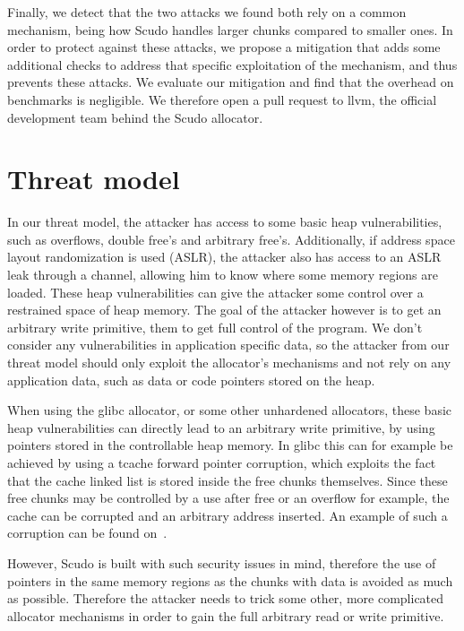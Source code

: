 \documentclass[a4paper,11pt,oneside]{report}
\begin{document}
Finally, we detect that the two attacks we found both rely on a common mechanism, being how
Scudo handles larger chunks compared to smaller ones. In order to protect against these
attacks, we propose a mitigation that adds some additional checks to address that specific
exploitation of the mechanism, and thus prevents these attacks. We evaluate our mitigation
and find that the overhead on benchmarks is negligible. We therefore open a pull request
to llvm, the official development team behind the Scudo allocator.

\chapter{Threat model}

In our threat model, the attacker has access to some basic heap vulnerabilities, such
as overflows, double free's and arbitrary free's. Additionally, if address space layout
randomization is used (ASLR), the attacker also has access to an ASLR leak through a
channel, allowing him to know where some memory regions are loaded.
These heap vulnerabilities can give the
attacker some control over a restrained space of heap memory. The goal of the attacker
however is to get an arbitrary write primitive, them to get full control of the 
program. We don't consider any vulnerabilities in application specific data, so the
attacker from our threat model should only exploit the allocator's mechanisms and not rely
on any application data, such as data or code pointers stored on the heap.

When using the glibc allocator, or some other unhardened allocators, these basic heap
vulnerabilities can directly lead to an arbitrary write primitive, by using pointers
stored in the controllable heap memory. In glibc this can for example be achieved by using
a tcache forward pointer corruption, which exploits the fact that the cache linked list is
stored inside the free chunks themselves. Since these free chunks may be controlled by a
use after free or an overflow for example, the cache can be corrupted and an arbitrary
address inserted. An example of such a corruption can be found on~\cite{tcachePoisoning}.

However, Scudo is built with such security issues in mind, therefore the use of pointers in
the same memory regions as the chunks with data is avoided as much as possible. Therefore
the attacker needs to trick some other, more complicated allocator mechanisms in order to
gain the full arbitrary read or write primitive.
\end{document}
